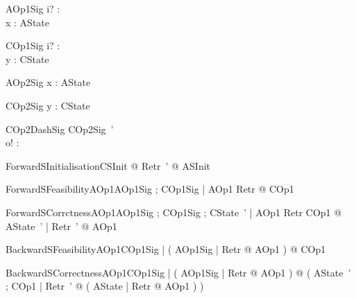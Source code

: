 \begin{schema}{AOp1Sig}
i? : \nat \\
 x : \power \nat 
\where
 AState
\end{schema}

 

\begin{schema}{COp1Sig}
i? : \nat \\
 y : \seq \nat 
\where
 CState
\end{schema}

 

\begin{schema}{AOp2Sig}
x : \power \nat 
\where
 AState
\end{schema}

 

\begin{schema}{COp2Sig}
y : \seq \nat 
\where
 CState
\end{schema}

 

\begin{schema}{COp2DashSig}
COp2Sig~' \\
 o! : \nat
\end{schema}

 

\begin{theorem}{ ForwardSInitialisation}\forall CSInit @ \exists Retr~' @ ASInit
\end{theorem}

 

\begin{theorem}{ ForwardSFeasibilityAOp1}\forall AOp1Sig ; COp1Sig | \pre AOp1 \land Retr @ \pre COp1
\end{theorem}

 

\begin{theorem}{ ForwardSCorrctnessAOp1}\forall AOp1Sig ; COp1Sig ; CState~' | \pre AOp1 \land Retr \land COp1 @ \exists AState~' | Retr~' @ AOp1
\end{theorem}

 

\begin{theorem}{ BackwardSFeasibilityAOp1}\forall COp1Sig | ( \forall AOp1Sig | Retr @ \pre AOp1 ) @ \pre COp1
\end{theorem}

 

\begin{theorem}{ BackwardSCorrectnessAOp1}\forall COp1Sig | ( \forall AOp1Sig | Retr @ \pre AOp1 ) @ ( \forall AState~' ; COp1 | Retr~' @ ( \exists AState | Retr @ AOp1 ) )
\end{theorem}

